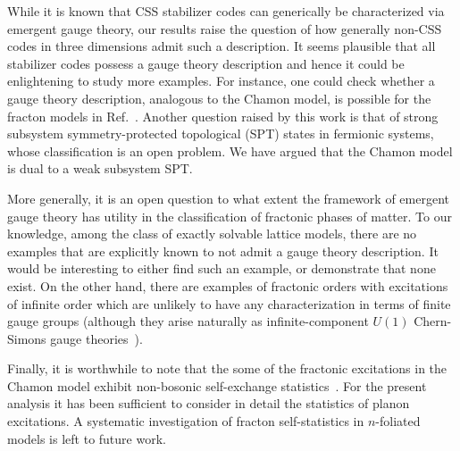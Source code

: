 \documentclass[prx,twocolumn,superscriptaddress,nofootinbib,showpacs,notitlepage]{revtex4-2}
\newcommand{\Chamon}{Chamon }
\newcommand{\arpit}[1]{{\color{ultramarine}\footnotesize{(AD) #1}}}
\begin{document}
While it is known that CSS stabilizer codes can generically be characterized via emergent gauge theory, our results raise the question of how generally non-CSS codes in three dimensions admit such a description. It seems plausible that all stabilizer codes possess a gauge theory description and hence it could be enlightening to study more examples. For instance, one could check whether a gauge theory description, analogous to the Chamon model, is possible for the fracton models in Ref.~\cite{HHB}. Another question raised by this work is that of strong subsystem symmetry-protected topological (SPT) states in fermionic systems, whose classification is an open problem. We have argued that the Chamon model is dual to a weak subsystem SPT.

More generally, it is an open question to what extent the framework of emergent gauge theory has utility in the classification of fractonic phases of matter. To our knowledge, among the class of exactly solvable lattice models, there are no examples that are explicitly known to not admit a gauge theory description. It would be interesting to either find such an example, or demonstrate that none exist. On the other hand, there are examples of fractonic orders with excitations of infinite order which are unlikely to have any characterization in terms of finite gauge groups (although they arise naturally as infinite-component $U(1)$ Chern-Simons gauge theories~\cite{ChernSimons}).

Finally, it is worthwhile to note that the some of the fractonic excitations in the Chamon model exhibit non-bosonic self-exchange statistics~\cite{FractonSelfStatistics}. For the present analysis it has been sufficient to consider in detail the statistics of planon excitations. A systematic investigation of fracton self-statistics in $n$-foliated models is left to future work.



\end{document}
